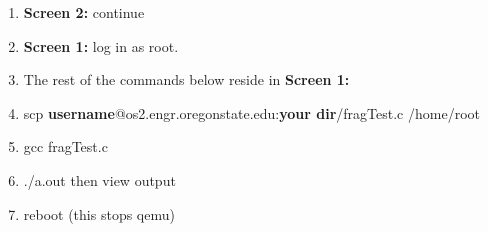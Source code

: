 \documentclass[draftclsnofoot, onecolumn, 10pt, compsoc]{IEEEtran}
\begin{document}
\begin{enumerate}
\begin{enumerate}
					\item \textbf{Screen 2:} continue
					
					\item \textbf{Screen 1:} log in as root.
					
					\item The rest of the commands below reside in \textbf{Screen 1:}
					
					\item{scp \textbf{username}@os2.engr.oregonstate.edu:\textbf{your dir}/fragTest.c /home/root}
					
					\item{gcc fragTest.c}
					\item{./a.out then view output}
					
					\item reboot (this stops qemu)
				\end{enumerate}
			\end{enumerate}
\end{document}
